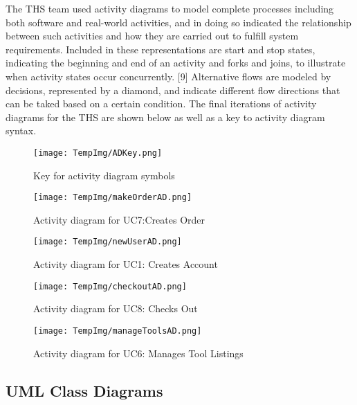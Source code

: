 \documentclass[fontsize=11pt]{extarticle}
\numberwithin{figure}{section} %
\numberwithin{table}{section}%
\begin{document}
The THS team used activity diagrams to model complete processes
including both software and real-world activities, and in doing so
indicated the relationship between such activities and how they are
carried out to fulfill system requirements. Included in these
representations are start and stop states, indicating the beginning and
end of an activity and forks and joins, to illustrate when activity
states occur concurrently. {[}9{]} Alternative flows are modeled by
decisions, represented by a diamond, and indicate different flow
directions that can be taked based on a certain condition. The final
iterations of activity diagrams for the THS are shown below as well as a
key to activity diagram syntax.

\begin{figure}[H]
      \centering
      \texttt{[image: TempImg/ADKey.png]}
      \caption{Key for activity diagram symbols}
 \end{figure}

\begin{figure}[H]
      \centering
      \texttt{[image: TempImg/makeOrderAD.png]}
      \caption{Activity diagram for UC7:Creates Order}
 \end{figure}

\begin{figure}[H]
      \centering
      \texttt{[image: TempImg/newUserAD.png]}
      \caption{Activity diagram for UC1: Creates Account}
 \end{figure}

\begin{figure}[H]
      \centering
      \texttt{[image: TempImg/checkoutAD.png]}
      \caption{Activity diagram for UC8: Checks Out}
 \end{figure}

\begin{figure}[H]
      \centering
      \texttt{[image: TempImg/manageToolsAD.png]}
      \caption{Activity diagram for UC6: Manages Tool Listings}
 \end{figure}

\hypertarget{uml-class-diagrams}{%
\subsection{UML Class Diagrams}\label{uml-class-diagrams}}
\end{document}
